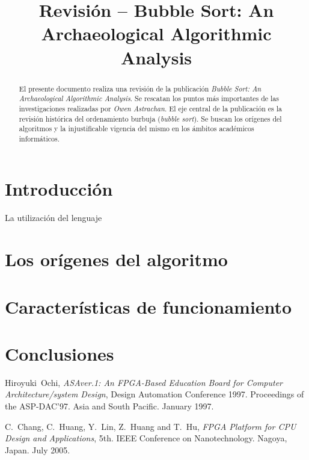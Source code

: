 \documentclass[conference]{IEEEtran}
\begin{document}
%
\title{Revisión -- Bubble Sort: An Archaeological Algorithmic Analysis}


\author{
}

\maketitle


\begin{abstract}
El presente documento realiza una revisión de la publicación
\emph{Bubble Sort: An Archaeological Algorithmic Analysis}. Se
rescatan los puntos más importantes de las investigaciones realizadas
por \emph{Owen Astrachan}. El eje central de la publicación es la
revisión histórica del ordenamiento burbuja (\emph{bubble
  sort}). Se buscan los orígenes del algoritmos y la injustificable
vigencia del mismo en los ámbitos académicos informáticos.
\end{abstract}

\IEEEpeerreviewmaketitle

\section{Introducción}
\label{sec:intro}

La utilización del lenguaje 


\section{Los orígenes del algoritmo}
\label{sec:origen-alg}

\section{Características de funcionamiento}
\label{sec:car-func}

\section{Conclusiones}
\label{sec:conc}


\begin{thebibliography}{1}

Hiroyuki~Ochi, \emph{ASAver.1: An FPGA-Based Education Board for Computer Architecture/system Design}, Design Automation Conference 1997. Proceedings of the ASP-DAC'97. Asia and South Pacific. January 1997.

C.~Chang, C.~Huang, Y.~Lin, Z.~Huang and T.~Hu, \emph{FPGA Platform for CPU Design and Applications},  5th. IEEE Conference on Nanotechnology. Nagoya, Japan. July 2005.

\end{thebibliography}

\end{document}
